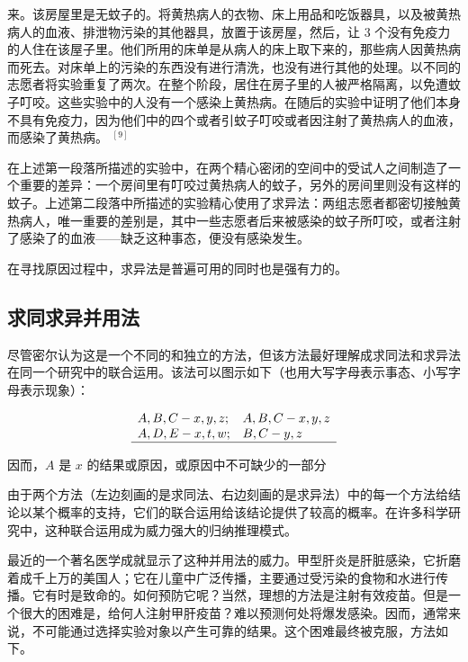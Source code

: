 \begin{displayquote}
来。该房屋里是无蚊子的。将黄热病人的衣物、床上用品和吃饭器具，以及被黄热病人的血液、排泄物污染的其他器具，放置于该房屋，然后，让 3 个没有免疫力的人住在该屋子里。他们所用的床单是从病人的床上取下来的，那些病人因黄热病而死去。对床单上的污染的东西没有进行清洗，也没有进行其他的处理。以不同的志愿者将实验重复了两次。在整个阶段，居住在房子里的人被严格隔离，以免遭蚊子叮咬。这些实验中的人没有一个感染上黄热病。在随后的实验中证明了他们本身不具有免疫力，因为他们中的四个或者引蚊子叮咬或者因注射了黄热病人的血液，而感染了黄热病。 ${ }^{[9]}$
\end{displayquote}

在上述第一段落所描述的实验中，在两个精心密闭的空间中的受试人之间制造了一个重要的差异：一个房间里有叮咬过黄热病人的蚊子，另外的房间里则没有这样的蚊子。上述第二段落中所描述的实验精心使用了求异法：两组志愿者都密切接触黄热病人，唯一重要的差别是，其中一些志愿者后来被感染的蚊子所叮咬，或者注射了感染了的血液——缺乏这种事态，便没有感染发生。

在寻找原因过程中，求异法是普遍可用的同时也是强有力的。

\subsection{求同求异并用法}
尽管密尔认为这是一个不同的和独立的方法，但该方法最好理解成求同法和求异法在同一个研究中的联合运用。该法可以图示如下（也用大写字母表示事态、小写字母表示现象）：

$$
\begin{array}{ll}
A, B, C-x, y, z ; & A, B, C-x, y, z \\
A, D, E-x, t, w ; & B, C-y, z \\
\hline
\end{array}
$$

因而，$A$ 是 $x$ 的结果或原因，或原因中不可缺少的一部分

由于两个方法（左边刻画的是求同法、右边刻画的是求异法）中的每一个方法给结论以某个概率的支持，它们的联合运用给该结论提供了较高的概率。在许多科学研究中，这种联合运用成为威力强大的归纳推理模式。

最近的一个著名医学成就显示了这种并用法的威力。甲型肝炎是肝脏感染，它折磨着成千上万的美国人；它在儿童中广泛传播，主要通过受污染的食物和水进行传播。它有时是致命的。如何预防它呢？当然，理想的方法是注射有效疫苗。但是一个很大的困难是，给何人注射甲肝疫苗？难以预测何处将爆发感染。因而，通常来说，不可能通过选择实验对象以产生可靠的结果。这个困难最终被克服，方法如下。

